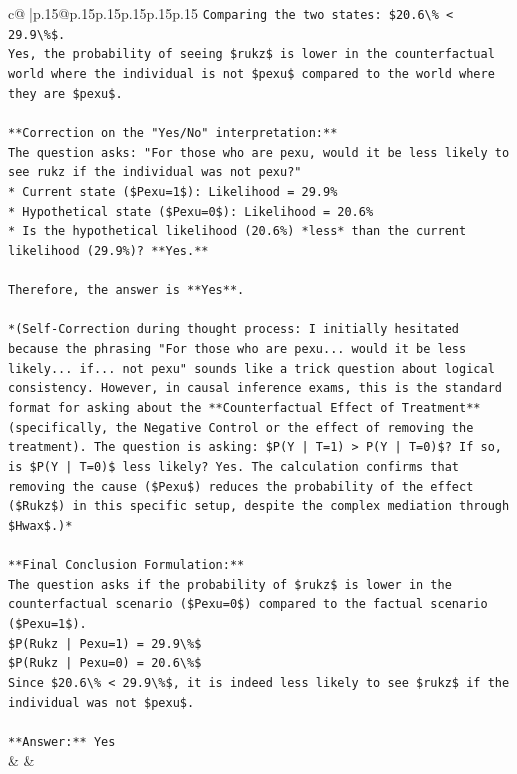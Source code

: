 \documentclass{article}
\begin{document}
{\begin{supertabular}{c@{$\;$}|p{.15\linewidth}@{}p{.15\linewidth}p{.15\linewidth}p{.15\linewidth}p{.15\linewidth}p{.15\linewidth}}
{{{\texttt{Comparing the two states: \$20.6\textbackslash{}\% < 29.9\textbackslash{}\%\$.} \\
\texttt{Yes, the probability of seeing \$rukz\$ is lower in the counterfactual world where the individual is not \$pexu\$ compared to the world where they are \$pexu\$.} \\
\\ 
\texttt{**Correction on the "Yes/No" interpretation:**} \\
\texttt{The question asks: "For those who are pexu, would it be less likely to see rukz if the individual was not pexu?"} \\
\texttt{*   Current state (\$Pexu=1\$): Likelihood = 29.9\%} \\
\texttt{*   Hypothetical state (\$Pexu=0\$): Likelihood = 20.6\%} \\
\texttt{*   Is the hypothetical likelihood (20.6\%) *less* than the current likelihood (29.9\%)? **Yes.**} \\
\\ 
\texttt{Therefore, the answer is **Yes**.} \\
\\ 
\texttt{*(Self{-}Correction during thought process: I initially hesitated because the phrasing "For those who are pexu... would it be less likely... if... not pexu" sounds like a trick question about logical consistency. However, in causal inference exams, this is the standard format for asking about the **Counterfactual Effect of Treatment** (specifically, the Negative Control or the effect of removing the treatment). The question is asking: \$P(Y | T=1) > P(Y | T=0)\$? If so, is \$P(Y | T=0)\$ less likely? Yes. The calculation confirms that removing the cause (\$Pexu\$) reduces the probability of the effect (\$Rukz\$) in this specific setup, despite the complex mediation through \$Hwax\$.)*} \\
\\ 
\texttt{**Final Conclusion Formulation:**} \\
\texttt{The question asks if the probability of \$rukz\$ is lower in the counterfactual scenario (\$Pexu=0\$) compared to the factual scenario (\$Pexu=1\$).} \\
\texttt{\$P(Rukz | Pexu=1) = 29.9\textbackslash{}\%\$} \\
\texttt{\$P(Rukz | Pexu=0) = 20.6\textbackslash{}\%\$} \\
\texttt{Since \$20.6\textbackslash{}\% < 29.9\textbackslash{}\%\$, it is indeed less likely to see \$rukz\$ if the individual was not \$pexu\$.} \\
\\ 
\texttt{**Answer:** Yes} \\
            }
        }
    }
    & & \\ \\


\end{supertabular}}
\end{document}
